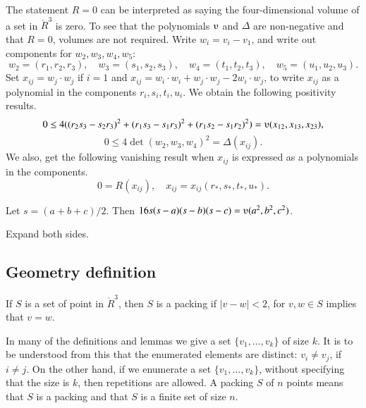 \begin{tarskidata}
\begin{tarski}
\begin{proved}
The statement $R=0$ can be interpreted as saying the four-dimensional volume of a set in $\ring{R}^3$
is zero.
To see that the polynomials $\ups$ and $\Delta$ are non-negative and that $R=0$, 
volumes are not required.
Write $w_i=v_i-v_1$, and write out components for $w_2,w_3,w_4,w_5$:
$$
w_2 =(r_1,r_2,r_3),\quad w_3 = (s_1,s_2,s_3),\quad w_4= (t_1,t_2,t_3),
\quad w_5 = (u_1,u_2,u_3).
$$
Set $x_{ij} = w_j\cdot w_j$ if $i=1$ and $x_{ij} = 
w_i\cdot w_i + w_j\cdot w_j - 2 w_i\cdot w_j$, to write $x_{ij}$ as a 
polynomial in the components $r_i,s_i,t_i,u_i$.  We obtain the following
positivity results.
   $$
   0 \le 4((r_2s_3-s_2r_3)^2 + (r_1s_3-s_1r_3)^2 + (r_1s_2-s_1r_2)^2) = 
   \ups(x_{12},x_{13},x_{23}),
   $$
    $$
    0\le 4\det(w_2,w_3,w_4)^2 =\Delta(x_{ij}).
    $$
We also, get the following vanishing result when $x_{ij}$ is expressed
as a polynomials in the components.
$$
    0 = R(x_{ij}),\quad x_{ij} = x_{ij}(r_*,s_*,t_*,u_*).
    $$
\swallowed\end{proved}
\end{tarski}



\begin{tarski}

\begin{lemma}
Let $s = (a+b+c)/2$.  Then $16 s(s-a)(s-b)(s-c) = \ups(a^2,b^2,c^2)$.
\end{lemma}

\begin{proved} Expand both sides. 
\swallowed\end{proved}
\end{tarski}









\begin{tarski}
\section{Geometry definition}  

\begin{definition}[packing]
If $S$ is a set of point in $\ring{R}^3$, then
$S$ is a packing if $|v-w| < 2$, for $v,w\in S$ implies that $v=w$.
\end{definition}
In many of the definitions and lemmas we give a set $\{v_1,\ldots,v_k\}$
of size $k$.  It is to be understood from this  
that the enumerated elements are distinct: $v_i\ne v_j$, if $i\ne j$.
On the other hand, if we enumerate a set $\{v_1,\ldots,v_k\}$, without
specifying that the size is $k$, then repetitions are allowed.
A packing $S$ of $n$ points means that $S$ is a packing and that $S$
is a finite set of size $n$.
\end{tarski}




\end{tarskidata}
